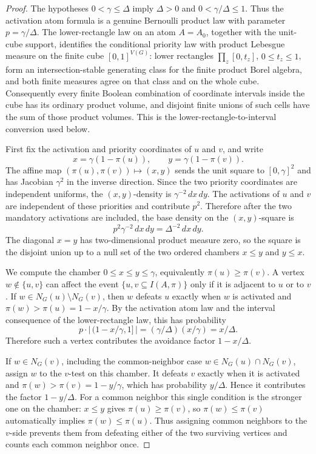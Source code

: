 \begin{proof}
The hypotheses \(0<\gamma\le\Delta\) imply \(\Delta>0\) and
\(0<\gamma/\Delta\le 1\).  Thus the activation atom formula is a genuine
Bernoulli product law with parameter \(p=\gamma/\Delta\).  The lower-rectangle
law on an atom \(A=A_0\), together with the unit-cube support, identifies the
conditional priority law with product Lebesgue measure on the finite cube
\([0,1]^{V(G)}\): lower rectangles
\(\prod_z[0,t_z]\), \(0\le t_z\le1\), form an intersection-stable generating
class for the finite product Borel algebra, and both finite measures agree on
that class and on the whole cube.  Consequently every finite Boolean
combination of coordinate intervals inside the cube has its ordinary product
volume, and disjoint finite unions of such cells have the sum of those product
volumes.  This is the lower-rectangle-to-interval conversion used below.

First fix the activation and priority coordinates of \(u\) and \(v\), and
write
\[
x=\gamma(1-\pi(u)),\qquad y=\gamma(1-\pi(v)).
\]
The affine map \((\pi(u),\pi(v))\mapsto(x,y)\) sends the unit square to
\([0,\gamma]^2\) and has Jacobian \(\gamma^2\) in the inverse direction.
Since the two priority coordinates are independent uniforms, the
\((x,y)\)-density is \(\gamma^{-2}\,dx\,dy\).  The activations of \(u\) and
\(v\) are independent of these priorities and contribute \(p^2\).  Therefore
after the two mandatory activations are included, the base density on the
\((x,y)\)-square is
\[
p^2\gamma^{-2}\,dx\,dy=\Delta^{-2}\,dx\,dy .
\]
The diagonal \(x=y\) has two-dimensional product measure zero, so the square
is the disjoint union up to a null set of the two ordered chambers
\(x\le y\) and \(y\le x\).

We compute the chamber \(0\le x\le y\le\gamma\), equivalently
\(\pi(u)\ge\pi(v)\).  A vertex \(w\notin\{u,v\}\) can affect the event
\(\{u,v\subseteq I(A,\pi)\}\) only if it is adjacent to \(u\) or to \(v\).
If \(w\in N_G(u)\setminus N_G(v)\), then \(w\) defeats \(u\) exactly when
\(w\) is activated and \(\pi(w)>\pi(u)=1-x/\gamma\).  By the activation atom
law and the interval consequence of the lower-rectangle law, this has
probability
\[
p\cdot |\,(1-x/\gamma,1]\,|=(\gamma/\Delta)(x/\gamma)=x/\Delta .
\]
Therefore such a vertex contributes the avoidance factor \(1-x/\Delta\).

If \(w\in N_G(v)\), including the common-neighbor case
\(w\in N_G(u)\cap N_G(v)\), assign \(w\) to the \(v\)-test on this chamber.
It defeats \(v\) exactly when it is activated and
\(\pi(w)>\pi(v)=1-y/\gamma\), which has probability \(y/\Delta\).  Hence it
contributes the factor \(1-y/\Delta\).  For a common neighbor this single
condition is the stronger one on the chamber: \(x\le y\) gives
\(\pi(u)\ge\pi(v)\), so \(\pi(w)\le\pi(v)\) automatically implies
\(\pi(w)\le\pi(u)\).  Thus assigning common neighbors to the \(v\)-side
prevents them from defeating either of the two surviving vertices and counts
each common neighbor once.


\end{proof}
